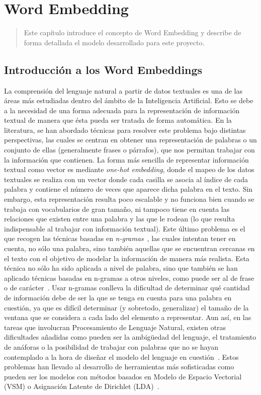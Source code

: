 \chapter{Word Embedding}
\label{ch:Capitulo 5}

\begin{quote}
  Este capítulo introduce el concepto de Word Embedding y describe de forma detallada el modelo desarrollado para este proyecto. 
\end{quote}

\section{Introducción a los Word Embeddings}
La comprensión del lenguaje natural a partir de datos textuales es una de las áreas más estudiadas dentro del ámbito de la Inteligencia Artificial. Esto se debe a la necesidad de una forma adecuada para la representación de información textual de manera que ésta pueda ser tratada de forma automática. En la literatura, se han abordado técnicas para resolver este problema bajo distintas perspectivas, las cuales se centran en obtener una representación de palabras o un conjunto de ellas (generalmente frases o párrafos), que nos permitan trabajar con la información que contienen. La forma más sencilla de representar información textual como vector es mediante \textit{one-hot embedding}, donde el mapeo de los datos textuales se realiza con un vector donde cada casilla se asocia al índice de cada palabra y contiene el número de veces que aparece dicha palabra en el texto. Sin embargo, esta representación resulta poco escalable y no funciona bien cuando se trabaja con vocabularios de gran tamaño, ni tampoco tiene en cuenta las relaciones que existen entre una palabra y las que le rodean (lo que resulta indispensable al trabajar con información textual). Este último problema es el que recogen las técnicas basadas en \textit{n-gramas}~\cite{jones2007representing}, las cuales intentan tener en cuenta, no sólo una palabra, sino también aquellas que se encuentran cercanas en el texto con el objetivo de modelar la información de manera más realista. Esta técnica no sólo ha sido aplicada a nivel de palabra, sino que también se han aplicado técnicas basadas en n-gramas a otros niveles, como puede ser al de frase o de carácter~\cite{wieting2016charagram}. Usar n-gramas conlleva la dificultad de determinar qué cantidad de información debe de ser la que se tenga en cuenta para una palabra en cuestión, ya que es difícil determinar (y sobretodo, generalizar) el tamaño de la ventana que se considera a cada lado del elemento a representar. Aun así, en las tareas que involucran Procesamiento de Lenguaje Natural, existen otras dificultades añadidas como pueden ser la ambigüedad del lenguaje, el tratamiento de anáforas o la posibilidad de trabajar con palabras que no se hayan contemplado a la hora de diseñar el modelo del lenguaje en cuestión~\cite{li2018word,anaphora}. Estos problemas han llevado al desarrollo de herramientas más sofisticadas como pueden ser los modelos con métodos basados en Modelo de Espacio Vectorial (VSM) o Asignación Latente de Dirichlet (LDA)~\cite{almeida2019word}. 

